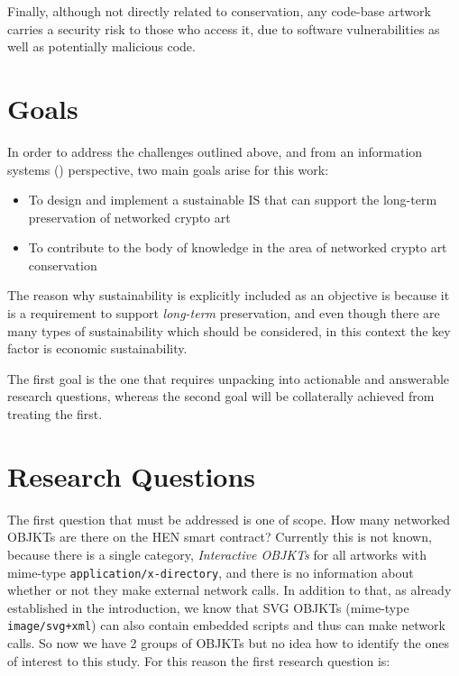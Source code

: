 Finally, although not directly related to conservation, any code-base artwork carries a security risk to those who access it, due to software vulnerabilities as well as potentially malicious code.

\section{Goals}

In order to address the challenges outlined above, and from an information systems () perspective, two main goals arise for this work:

\begin{itemize}
	\item To design and implement a sustainable IS that can support the long-term preservation of networked crypto art
	\item To contribute to the body of knowledge in the area of networked crypto art conservation
\end{itemize}

The reason why sustainability is explicitly included as an objective is because it is a requirement to support \emph{long-term} preservation, and even though there are many types of sustainability which should be considered, in this context the key factor is economic sustainability.

The first goal is the one that requires unpacking into actionable and answerable research questions, whereas the second goal will be collaterally achieved from treating the first.

\section{Research Questions}

The first question that must be addressed is one of scope. How many networked OBJKTs are there on the HEN smart contract? Currently this is not known, because there is a single category, \emph{Interactive OBJKTs} for all artworks with mime-type \texttt{application/x-directory}, and there is no information about whether or not they make external network calls. In addition to that, as already established in the introduction, we know that SVG OBJKTs (mime-type \texttt{image/svg+xml}) can also contain embedded scripts and thus can make network calls. So now we have 2 groups of OBJKTs but no idea how to identify the ones of interest to this study. For this reason the first research question is:

